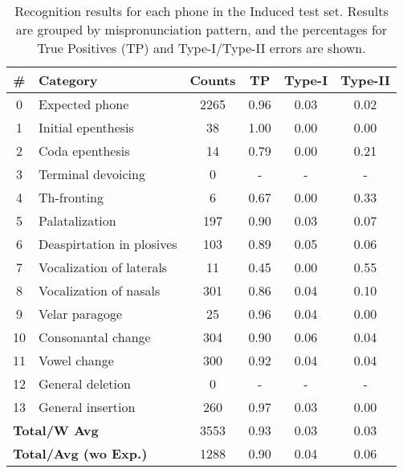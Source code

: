 \documentclass[twocolumn]{bmcart}%
\begin{document}
\small
\begin{table}[ht!]
\caption{Recognition results for each phone in the Induced test set. Results are grouped by mispronunciation pattern, and the percentages for True Positives (TP) and Type-I/Type-II errors are shown.}
\setlength{\tabcolsep}{0.3em}
\begin{tabular}{clcccc} \hline
\textbf{\#} & \textbf{Category} & \textbf{Counts} & \textbf{TP} & \textbf{Type-I} & \textbf{Type-II} \\ \hline
0 & Expected phone & 2265 & 0.96 & 0.03 & 0.02 \\
1 & Initial epenthesis & 38 & 1.00 & 0.00 & 0.00 \\
2 & Coda epenthesis & 14 & 0.79 & 0.00 & 0.21 \\
3 & Terminal devoicing & 0 & - & - & - \\
4 & Th-fronting & 6 & 0.67 & 0.00 & 0.33 \\
5 & Palatalization & 197 & 0.90 & 0.03 & 0.07 \\
6 & Deaspirtation in plosives & 103 & 0.89 & 0.05 & 0.06 \\
7 & Vocalization of laterals & 11 & 0.45 & 0.00 & 0.55 \\
8 & Vocalization of nasals & 301 & 0.86 & 0.04 & 0.10 \\
9 & Velar paragoge & 25 & 0.96 & 0.04 & 0.00 \\
10 & Consonantal change & 304 & 0.90 & 0.06 & 0.04 \\
11 & Vowel change & 300 & 0.92 & 0.04 & 0.04 \\
12 & General deletion & 0 & - & - & - \\
13 & General insertion & 260 & 0.97 & 0.03 & 0.00 \\ \hline
\multicolumn{2}{l}{\textbf{Total/W Avg}} & 3553 & 0.93 & 0.03 & 0.03 \\ 
\multicolumn{2}{l}{\textbf{Total/Avg (wo Exp.)}} & 1288 & 0.90 & 0.04 & 0.06 \\  \hline
\end{tabular}
\label{rec-induced}
\end{table}
\end{document}
